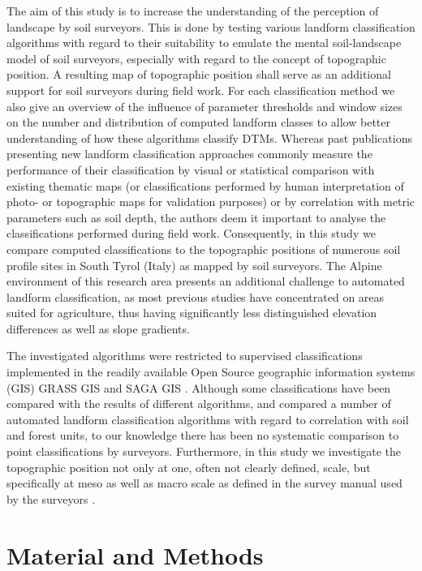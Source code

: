 \documentclass[preprint,12pt,authoryear]{elsarticle}
\begin{document}
The aim of this study is to increase the understanding of the perception of landscape by soil surveyors. This is done by testing various landform classification algorithms with regard to their suitability to emulate the mental soil-landscape model of soil surveyors, especially with regard to the concept of topographic position. A resulting map of topographic position shall serve as an additional support for soil surveyors during field work. For each classification method we also give an overview of the influence of parameter thresholds and window sizes on the number and distribution of computed landform classes to allow better understanding of how these algorithms classify DTMs. Whereas past publications presenting new landform classification approaches commonly measure the performance of their classification by visual or statistical comparison with existing thematic maps (or classifications performed by human interpretation of photo- or topographic maps for validation purposes) or by correlation with metric parameters such as soil depth, the authors deem it important to analyse the classifications performed during field work. Consequently, in this study we compare computed classifications to the topographic positions of numerous soil profile sites in South Tyrol (Italy) as mapped by soil surveyors. The Alpine environment of this research area presents an additional challenge to automated landform classification, as most previous studies have concentrated on areas suited for agriculture, thus having significantly less distinguished elevation differences as well as slope gradients.

The investigated algorithms were restricted to supervised classifications implemented in the readily available Open Source geographic information systems (GIS) GRASS GIS \citep{GRASS_GIS_software} and SAGA GIS \citep{conrad2015system}.  Although some classifications have been compared with the results of different algorithms, and \cite{Barka2011} compared a number of automated landform classification algorithms with regard to correlation with soil and forest units, to our knowledge there has been no systematic comparison to point classifications by surveyors. Furthermore, in this study we investigate the topographic position not only at one, often not clearly defined, scale, but specifically at meso as well as macro scale as defined in the survey manual used by the surveyors \citep{Englisch1998}.

\section{Material and Methods}
\end{document}
